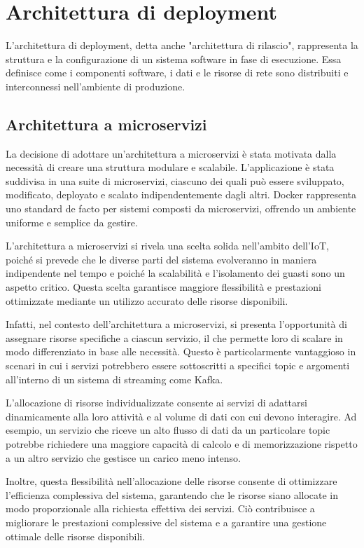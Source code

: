 \section{Architettura di deployment}
L'architettura di deployment, detta anche "architettura di rilascio", rappresenta la struttura e la configurazione di un sistema software in fase di esecuzione. Essa definisce come i componenti software, i dati e le risorse di rete sono distribuiti e interconnessi nell'ambiente di produzione.

\subsection{Architettura a microservizi}
La decisione di adottare un'architettura a microservizi è stata motivata dalla necessità di creare una struttura modulare e scalabile. L'applicazione è stata suddivisa in una suite di microservizi, ciascuno dei quali può essere sviluppato, modificato, deployato e scalato indipendentemente dagli altri. Docker rappresenta uno standard de facto per sistemi composti da microservizi, offrendo un ambiente uniforme e semplice da gestire.

L'architettura a microservizi si rivela una scelta solida nell'ambito dell'IoT, poiché si prevede che le diverse parti del sistema evolveranno in maniera indipendente nel tempo e poiché la scalabilità e l'isolamento dei guasti sono un aspetto critico. Questa scelta garantisce maggiore flessibilità e prestazioni ottimizzate mediante un utilizzo accurato delle risorse disponibili.

Infatti, nel contesto dell'architettura a microservizi, si presenta l'opportunità di assegnare risorse specifiche a ciascun servizio, il che permette loro di scalare in modo differenziato in base alle necessità. Questo è particolarmente vantaggioso in scenari in cui i servizi potrebbero essere sottoscritti a specifici topic e argomenti all'interno di un sistema di streaming come Kafka.

L'allocazione di risorse individualizzate consente ai servizi di adattarsi dinamicamente alla loro attività e al volume di dati con cui devono interagire. Ad esempio, un servizio che riceve un alto flusso di dati da un particolare topic potrebbe richiedere una maggiore capacità di calcolo e di memorizzazione rispetto a un altro servizio che gestisce un carico meno intenso.

Inoltre, questa flessibilità nell'allocazione delle risorse consente di ottimizzare l'efficienza complessiva del sistema, garantendo che le risorse siano allocate in modo proporzionale alla richiesta effettiva dei servizi. Ciò contribuisce a migliorare le prestazioni complessive del sistema e a garantire una gestione ottimale delle risorse disponibili.

